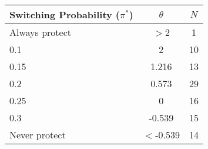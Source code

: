 \begin{tabular}{l c c}
\hline\hline
Switching Probability ($\pi^*$) &                $\theta$ & $N$\\
\hline
Always protect & $>$2 &   1 \\
0.1 & 2 & 10 \\
0.15 & 1.216 & 13 \\
0.2 & 0.573 & 29 \\
0.25 & 0 & 16 \\
0.3 & -0.539 & 15 \\
Never protect & $<$-0.539 &  14 \\
\hline
\end{tabular}

